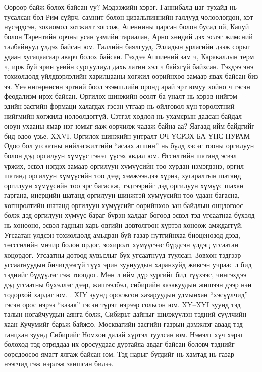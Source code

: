 Өөрөөр байж болох байсан уу? Мэдээжийн хэрэг. Ганнибалд цаг тухайд нь тусалсан бол Рим сүйрч, самнит болон цизальпиннийн галлууд чөлөөлөгдөн, хэт нүсэрдсэн, зохиомол хотжилт зогсож, Апеннины царсан болон бусад ой, Капуй болон Тарентийн орчны усан үзмийн тариалан, Арно хөндий дэх эслэг жимсний талбайнууд үлдэх байсан юм. Галлийн баялгууд, Элладын урлагийн дээж сорыг удаан хугацаагаар аварч болох байсан. Гэхдээ Аппиений зам ч, Каракаллын терм ч, ирж буй эрин үеийн сургуулиуд дахь латин хэл ч байхгүй байхсан. Гэхдээ энэ тохиолдолд үйлдвэрлэлийн харилцааны хөгжил өөрийнхөө замаар явах байсан биз ээ. Үеэ өнгөрөөсөн эртний боол эзэмшлийн оронд арай эрт юмуу хойно ч гэсэн феодализм ирэх байсан. Оргилох шинжийн өсөлт ба уналт нь хэрэв нийгэм – эдийн засгийн формаци халагдах гэсэн утгаар нь ойлговол хүн төрөлхтний нийгмийн хөгжилд нөлөөлдөггүй. Сэтгэл хөдлөл нь ухамсрын дадсан байдал–оюун ухааны ямар нэг юмыг яаж өөрчилж чадаж байна аа? Яагаад ийм байдгийг бид одоо үзье.
XXVI. Оргилох шинжийн унтралт
ОЧ ҮСРЭХ БА ҮНС НУРАМ
Одоо бол угсаатны нийлэгжилтийн “асаах агшин” нь бүлд хэсэг тооны оргилуун болон дэд оргилуун хүмүүс гэнэт үүсэх явдал юм. Өгсөлтийн шатанд эсвэл үржих, эсвэл нэгдэх замаар оргилуун хүмүүсийн тоо хурдан нэмэгдэнэ, оргил шатанд оргилуун хүмүүсийн тоо дээд хэмжээндээ хүрнэ, хугаралтын шатанд оргилуун хүмүүсийн тоо эрс багасаж, тэдгээрийг дэд оргилуун хүмүүс шахан гаргана, инерцийн шатанд оргилуун шинжтэй хүмүүсийн тоо удаан багасна, хөгшрөлтийн шатанд оргилуун хүмүүсийг өөрийнхөө зан байдлын онцлогоос болж дэд оргилуун хүмүүс бараг бүрэн халдаг бөгөөд эсвэл тэд угсаатнаа бүхэлд нь хөнөөнө, эсвэл гаднын харь овгийн довтолгоон хүртэл хөнөөж амждаггүй. Угсаатан үлдсэн тохиолдолд амьдран буй газар нутгийнхаа биоценозод дээд, төгсгөлийн мөчир болон ордог, зохиролт хүмүүсээс бүрдсэн үлдэц угсаатан хоцордог.
Угсаатны дотоод хувьслыг бүх угсаатнууд туулсан. Зөвхөн тэдгээр угсаатнуудын бичигдээгүй түүх эрин зуунуудын харанхуйд живсэн учраас л бид тэднийг бүдүүлэг гэж тооцдог. Мөн л ийм дүр зургийг бид түүхээс, чингэхдээ дэд угсаатны бүхэллэг дээр, жишээлбэл, сибирийн казакуудын жишээн дээр нэн тодорхой хардаг юм. .
XIY зуунд оросжсон хазаруудын удмынхан “хэсүүлчид” гэсэн орос нэрээ “казак” гэсэн түрэг нэрээр сольсон юм. XY–XYI зуунд тэд талын ногайчуудын аянга болж, Сибирьт дайныг шилжүүлэн тэдний сүүлчийн хаан Кучумийг барьж байжээ. Москвагийн засгийн газрын дэмжлэг аваад тэд ганцхан зуунд Сибирийг Номхон далай хүртэл туулсан юм. Нэмэлт хүч хэрэг болоход тэд отряддаа их оросуудаас дуртайяа авдаг байсан боловч тэднийг өөрсдөөсөө ямагт ялгаж байсан юм. Тэд нарыг бүгдийг нь хамтад нь газар нээгчид гэж нэрлэж заншсан билээ.
